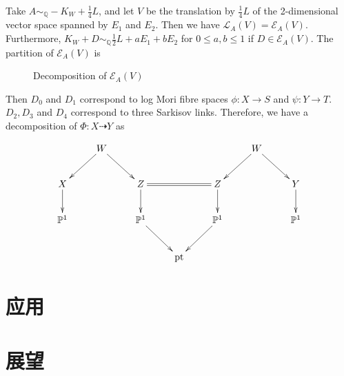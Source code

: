 Take $A\sim_{\mathbb{Q}}-K_{W}+\frac{1}{4}L$, and let $V$ be the translation by  $\frac{1}{4}L$ of the 2-dimensional vector space spanned by $E_{1}$ and  $E_{2}$. Then we have $\mathcal{L}_{A}(V)=\mathcal{E}_{A}(V)$. Furthermore,  $K_{W}+D\sim_{\mathbb{Q}} \frac{1}{2}L+aE_{1}+bE_{2}$ for $0\leqslant a,b\leqslant 1$ if $D \in \mathcal{E}_{A}(V)$. The partition of $\mathcal{E}_{A}(V)$ is
\begin{figure}
\centering
    \caption{Decomposition of $\mathcal{E}_A(V)$}
    \label{pic}
\end{figure}
Then $D_{0}$ and $D_{1}$ correspond to log Mori fibre spaces $\phi:X\to S$ and $\psi:Y\to T$. $D_{2},D_{3}$ and $D_{4}$ correspond to three Sarkisov links. Therefore, we have a decomposition of $\Phi: X\dashrightarrow  Y$ as

\[
  \xymatrix{
    &W\ar[ld]\ar[rd] &&&&W\ar[ld]\ar[rd] \\
    X\ar[d]& &Z\ar[d]\ar@{=}[rr]&&Z\ar[d]&&Y\ar[d]\\
    \mathbb{P}^{1}&&\mathbb{P}^{1}\ar[dr]&&\mathbb{P}^{1}\ar[dl]&&\mathbb{P}^{1}\\
    &&&\text{pt}
  }
\]

\section{应用}

\section{展望}
